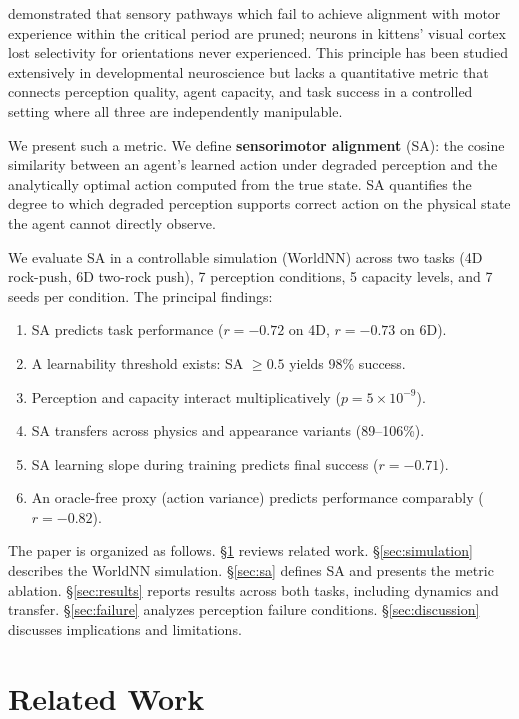 \documentclass{article}
\begin{document}
\citet{blakemore1970development} demonstrated that sensory pathways which fail to
achieve alignment with motor experience within the critical period are pruned;
neurons in kittens' visual cortex lost selectivity for orientations never
experienced. This principle has been studied extensively in developmental
neuroscience \citep{hubel1970period, huang1999bdnf} but lacks a quantitative
metric that connects perception quality, agent capacity, and task success in a
controlled setting where all three are independently manipulable.

We present such a metric. We define \textbf{sensorimotor alignment} (SA): the
cosine similarity between an agent's learned action under degraded perception and
the analytically optimal action computed from the true state. SA quantifies the
degree to which degraded perception supports correct action on the physical state
the agent cannot directly observe.

We evaluate SA in a controllable simulation (WorldNN) across two tasks (4D
rock-push, 6D two-rock push), 7 perception conditions, 5 capacity levels, and 7
seeds per condition. The principal findings:
\begin{enumerate}
  \item SA predicts task performance ($r = -0.72$ on 4D, $r = -0.73$ on 6D).
  \item A learnability threshold exists: SA $\geq 0.5$ yields 98\% success.
  \item Perception and capacity interact multiplicatively ($p = 5 \times 10^{-9}$).
  \item SA transfers across physics and appearance variants (89--106\%).
  \item SA learning slope during training predicts final success ($r = -0.71$).
  \item An oracle-free proxy (action variance) predicts performance comparably ($r = -0.82$).
\end{enumerate}

The paper is organized as follows. \S\ref{sec:related} reviews related work.
\S\ref{sec:simulation} describes the WorldNN simulation. \S\ref{sec:sa} defines
SA and presents the metric ablation. \S\ref{sec:results} reports results across
both tasks, including dynamics and transfer. \S\ref{sec:failure} analyzes
perception failure conditions. \S\ref{sec:discussion} discusses implications and
limitations.

\section{Related Work}
\label{sec:related}
\end{document}

